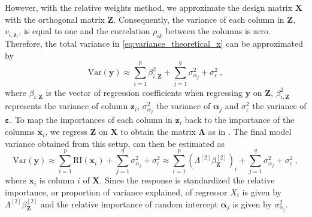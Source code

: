 However, with the relative weights method, we approximate the design matrix $\mathbf{X}$ with the orthogonal matrix $\mathbf{Z}$. 
Consequently, the variance of each column in $\mathbf{Z}$, $v_{i, \mathbf{z}_i}$, is equal to one and the correlation $\rho_{ik}$ between the columns is zero. 
Therefore, the total variance in \eqref{eq:variance_theoretical_x} can be approximated by
\begin{equation}\label{eq:variance_rw}
    \text{Var}(\mathbf{y}) \approx \sum_{i=1}^p \beta_{i, \mathbf{Z}}^2 + \sum_{j=1}^q \sigma^2_{\alpha_j} + \sigma^2_{\epsilon} \ ,
\end{equation}
where $\beta_{i, \mathbf{Z}}$ is the vector of regression coefficients when regressing $\mathbf{y}$ on $\mathbf{Z}$, $\beta_{i, \mathbf{Z}}^2$ represents the variance of column $\mathbf{z}_i$, $\sigma_{\alpha_j}^2$ the variance of $\boldsymbol{\alpha}_j$ and $\sigma^2_{\varepsilon}$ the variance of $\boldsymbol{\varepsilon}$.
To map the importances of each column in $\mathbf{z}_i$ back to the importance of the columns $\mathbf{x}_i$, we regress $\mathbf{Z}$ on $\mathbf{X}$ to obtain the matrix $\boldsymbol{\Lambda}$ as in .
The final model variance obtained from this setup, can then be estimated as 
\begin{equation}
    \label{eq:variance_calc}
    \text{Var}(\mathbf{y}) \approx \sum_{i=1}^p \text{RI}(\mathbf{x}_i) + \sum_{j=1}^q \sigma^2_{\alpha_j} + \sigma^2_{\epsilon} \approx \sum_{i=1}^p (\Lambda^{[2]}\beta_{\mathbf{Z}}^{[2]})_i + \sum_{j=1}^q \sigma^2_{\alpha_j} + \sigma^2_{\epsilon} \ ,
\end{equation}
where $\mathbf{x}_i$ is column $i$ of $\mathbf{X}$.  
Since the response is standardized the relative importance, or proportion of variance explained, of regressor $X_i$ is given by $\Lambda^{[2]}\beta_{\mathbf{Z}}^{[2]}$ and the relative importance of random intercept $\boldsymbol{\alpha}_j$ is given by $\sigma^2_{\alpha_j}$.
